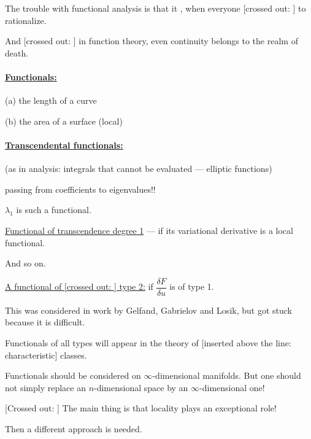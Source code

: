 The trouble with functional analysis is that it ,
when everyone [crossed out: ]
 to rationalize.

And [crossed out: ]
in function theory, even
continuity belongs to the realm of death.

\paragraph*{\underline{Functionals:}}
(a) the length of a curve

(b) the area of a surface \qquad (local)

\paragraph*{\underline{Transcendental functionals:}}
(as in analysis: integrals that cannot be evaluated --- elliptic functions)

passing from coefficients to eigenvalues!!

$\lambda_1$ is such a functional.

\underline{Functional of transcendence degree 1} --- if its variational derivative is a local functional.

And so on.

\underline{A functional of [crossed out: ]
type 2:} if $\dfrac{\delta F}{\delta u}$ is of type 1.

This was considered in work by Gelfand, Gabrielov and Losik,
but got stuck because it is difficult.

Functionals of all types will appear in the theory of [inserted above the line: characteristic] classes.

Functionals should be considered on $\infty$-dimensional manifolds. But one should not simply
replace an $n$-dimensional space by an $\infty$-dimensional one!

[Crossed out: ]
The main thing is that locality plays an exceptional role!

Then a different approach is needed.

